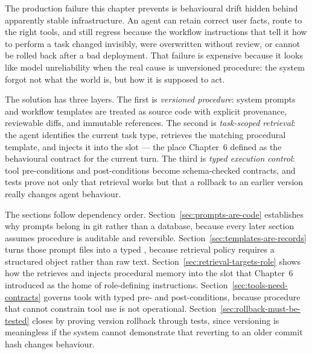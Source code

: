 

The production failure this chapter prevents is behavioural drift hidden behind apparently stable infrastructure. An agent can retain correct user facts, route to the right tools, and still regress because the workflow instructions that tell it how to perform a task changed invisibly, were overwritten without review, or cannot be rolled back after a bad deployment. That failure is expensive because it looks like model unreliability when the real cause is unversioned procedure: the system forgot not what the world is, but how it is supposed to act.

The solution has three layers. The first is \emph{versioned procedure}: system prompts and workflow templates are treated as source code with explicit provenance, reviewable diffs, and immutable references. The second is \emph{task-scoped retrieval}: the agent identifies the current task type, retrieves the matching procedural template, and injects it into the  slot --- the place Chapter~6 defined as the behavioural contract for the current turn. The third is \emph{typed execution control}: tool pre-conditions and post-conditions become schema-checked contracts, and tests prove not only that retrieval works but that a rollback to an earlier version really changes agent behaviour.

The sections follow dependency order. Section~\ref{sec:prompts-are-code} establishes why prompts belong in git rather than a database, because every later section assumes procedure is auditable and reversible. Section~\ref{sec:templates-are-records} turns those prompt files into a typed , because retrieval policy requires a structured object rather than raw text. Section~\ref{sec:retrieval-targets-role} shows how the  retrieves and injects procedural memory into the  slot that Chapter~6 introduced as the home of role-defining instructions. Section~\ref{sec:tools-need-contracts} governs tools with typed pre- and post-conditions, because procedure that cannot constrain tool use is not operational. Section~\ref{sec:rollback-must-be-tested} closes by proving version rollback through tests, since versioning is meaningless if the system cannot demonstrate that reverting to an older commit hash changes behaviour.

